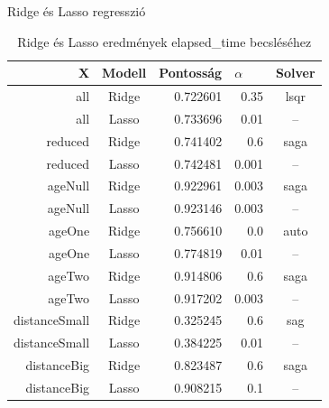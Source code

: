 Ridge és Lasso regresszió
\begin{table}[h!]
	\centering
	\begin{tabular}{|r|c|r|r|c|}
			\hline
			\textbf{X}    & \textbf{Modell} & \multicolumn{1}{l|}{\textbf{Pontosság}} & \multicolumn{1}{l|}{\textbf{$\alpha$}} & \textbf{Solver} \\ \hline
			all           & Ridge           & 0.722601                                & 0.35                                   & lsqr            \\ \hline
			all           & Lasso           & 0.733696                                & 0.01                                   & --              \\ \hline
			reduced       & Ridge           & 0.741402                                & 0.6                                    & saga            \\ \hline
			reduced       & Lasso           & 0.742481                                & 0.001                                  & --              \\ \hline
			ageNull       & Ridge           & 0.922961                                & 0.003                                  & saga            \\ \hline
			ageNull       & Lasso           & 0.923146                                & 0.003                                  & --              \\ \hline
			ageOne        & Ridge           & 0.756610                                & 0.0                                    & auto            \\ \hline
			ageOne        & Lasso           & 0.774819                                & 0.01                                   & --              \\ \hline
			ageTwo        & Ridge           & 0.914806                                & 0.6                                    & saga            \\ \hline
			ageTwo        & Lasso           & 0.917202                                & 0.003                                  & --              \\ \hline
			distanceSmall & Ridge           & 0.325245                                & 0.6                                    & sag             \\ \hline
			distanceSmall & Lasso           & 0.384225                                & 0.01                                   & --              \\ \hline
			distanceBig   & Ridge           & 0.823487                                & 0.6                                    & saga            \\ \hline
			distanceBig   & Lasso           & 0.908215                                & 0.1                                    & --              \\ \hline
	\end{tabular}
\caption{Ridge és Lasso eredmények elapsed\_time becsléséhez}
\end{table}

